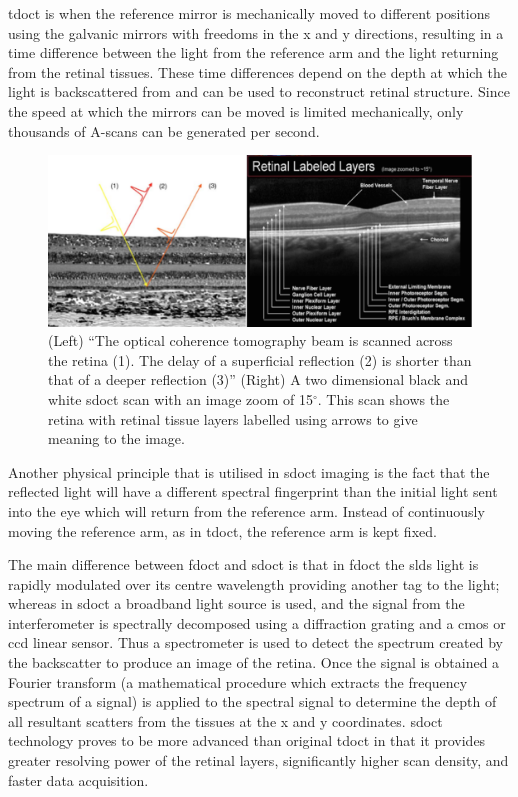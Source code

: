 \Gls{tdoct} is when the reference mirror is mechanically moved to different
positions using the galvanic mirrors with freedoms in the x and y directions,
resulting in a time difference between the light from the reference arm and the
light returning from the retinal tissues.  These time differences depend on the
depth at which the light is backscattered from and can be used to reconstruct
retinal structure.  Since the speed at which the mirrors can be moved is limited
mechanically, only thousands of A-scans can be generated per second.\cite{mbib_4}

\begin{figure}[H]
\centering
\includegraphics[width=16cm]{figures/morgan_4}
\caption{(Left) \enquote{The optical coherence tomography beam is
scanned across the retina (1). The delay of a superficial reflection (2)
is shorter than that of a deeper reflection (3)} (Right) A two
dimensional black and white \Gls{sdoct} scan with an image zoom of
15$^\circ$.\cite{mbib_6}  This scan shows the retina with retinal tissue
layers labelled using arrows to give meaning to the image.\cite{mbib_8}}
\label{fig:m_4}
\end{figure}

Another physical principle that is utilised in \Gls{sdoct} imaging is the
fact that the reflected light will have a different spectral fingerprint than the
initial light sent into the eye which will return from the reference arm.  Instead
of continuously moving the reference arm, as in \Gls{tdoct}, the reference
arm is kept fixed.

The main difference between \Gls{fdoct} and \Gls{sdoct} is that in
\Gls{fdoct} the \Gls{sld}s light is rapidly modulated over its centre wavelength providing
another tag to the light; whereas in \Gls{sdoct} a broadband light source is used,
and the signal from the interferometer is spectrally decomposed using a diffraction
grating and a \Gls{cmos} or \Gls{ccd} linear sensor.\cite{mbib_4}
Thus a spectrometer is used to detect the spectrum created by the backscatter
to produce an image of the retina.  Once the signal is obtained a Fourier transform
(a mathematical procedure which extracts the frequency spectrum of a signal) is
applied to the spectral signal to determine the depth of all resultant scatters from
the tissues at the x and y coordinates.\cite{mbib_4,mbib_9} \Gls{sdoct} technology
proves to be more advanced than original \Gls{tdoct} in that it provides greater
resolving power of the retinal layers, significantly higher scan density, and faster
data acquisition. \cite{mbib_2}

